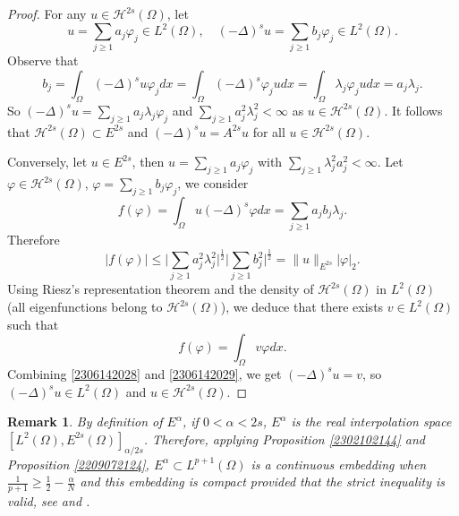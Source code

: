 \documentclass[10pt]{article}
\numberwithin{equation}{section}
\newtheorem{remark}[theorem]{Remark}
\numberwithin{equation}{section}
\begin{document}
\begin{proof}
For any $u\in \mathcal{H}^{2s}(\Omega)$, let
\[
u=\sum_{j\ge 1} a_j \varphi_j\in L^2(\Omega), \quad (-\Delta)^s u=\sum_{j\ge 1} b_j \varphi_j\in L^2(\Omega).
\]
Observe that
\[
b_j=\int_{\Omega}(-\Delta)^s u \varphi_j dx=\int_{\Omega}  (-\Delta)^s \varphi_j udx=\int_{\Omega}  \lambda_j \varphi_j udx=a_j\lambda_j.
\]
So $ (-\Delta)^s u= \sum_{j\ge 1} a_j \lambda_j \varphi_j$ and $\sum_{j\ge 1}a^2_j\lambda^2_j<\infty$ as $u\in \mathcal{H}^{2s}(\Omega)$. It follows that $\mathcal{H}^{2s}(\Omega)\subset E^{2s}$ and $(-\Delta)^s u = A^{2s}u$ for all $u\in \mathcal{H}^{2s}(\Omega)$.

Conversely, let $u\in E^{2s}$, then $u=\sum_{j\ge 1} a_j\varphi_j$ with $\sum_{j\ge 1} \lambda_j^2a_j^2 < \infty$. Let $\varphi \in \mathcal{H}^{2s}(\Omega)$, $\varphi=\sum_{j\ge 1} b_j\varphi_j$, we consider
\begin{equation}\label{2306142028}
f(\varphi)=\int_{\Omega}u (-\Delta)^s\varphi dx = \sum_{j\ge 1} a_jb_j\lambda_j.
\end{equation}
Therefore
\[
|f(\varphi)| \le \Big|\sum_{j\ge 1} a_j^2\lambda_j^2\Big|^{\frac12}\Big|\sum_{j\ge 1} b_j^2\Big|^{\frac12}= \lVert u\rVert_{E^{2s}}| \varphi|_{2}.
\]
Using Riesz's representation theorem and the density of $\mathcal{H}^{2s}(\Omega)$ in $L^2(\Omega)$ (all eigenfunctions belong to $\mathcal{H}^{2s}(\Omega)$), we deduce that there exists $v\in L^2(\Omega)$ such that
\begin{equation}\label{2306142029}
f(\varphi)=\int_{\Omega}v\varphi dx.
\end{equation}
Combining \eqref{2306142028} and \eqref{2306142029}, we get $(-\Delta)^su=v$, so $(-\Delta)^su\in L^2(\Omega)$ and $u\in \mathcal{H}^{2s}(\Omega)$.
\end{proof}
\begin{remark}\label{2211231543}
By definition of $E^\alpha$, if $0<\alpha<2s$, $E^\alpha$ is the real interpolation space $[L^2(\Omega), E^{2s}(\Omega)]_{\alpha / 2s}$. Therefore, applying Proposition \ref{2302102144} and Proposition \ref{2209072124}, $E^\alpha \subset L^{p+1}(\Omega)$ is a continuous embedding when $\frac{1}{p+1}\ge \frac12-\frac{\alpha}{N}$ and this embedding is compact provided that the strict inequality is valid, see \cite{Persson1964} and \cite[Sections 7.22, 7.23]{Adams2003}.
\end{remark}
\end{document}
